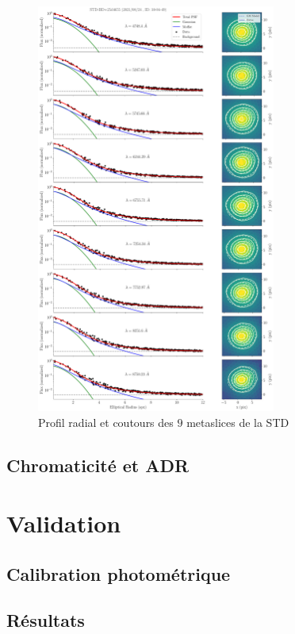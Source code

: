 \message{ !name(06_irf.tex)}\documentclass[../main/main.tex]{subfiles}
\begin{document}
\begin{figure}[ht]
  \centering
  \includegraphics[width=0.7\textwidth]{../figures/06_irf/STD_profile_allmeta.pdf}
  \caption[]{Profil radial et coutours des $9$ metaslices de la STD}
  \label{fig:}
\end{figure}

\subsection{Chromaticité et ADR}\label{ssec:chromadr}

\section{Validation}\label{sec:validationpsf}

\subsection{Calibration photométrique}\label{ssec:photocalibstd}

\subsection{Résultats}\label{ssec:resultscalib}






\end{document}
